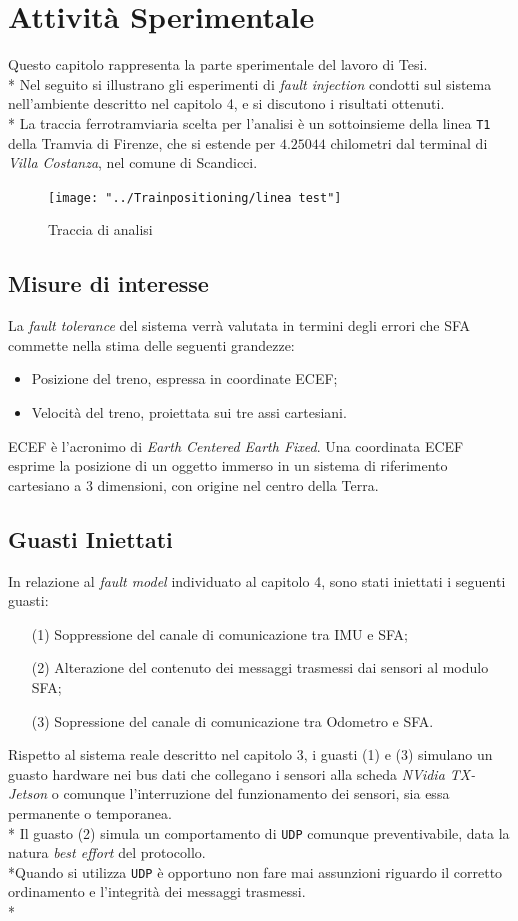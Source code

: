 \chapter{Attivit\`a Sperimentale}
Questo capitolo rappresenta la parte sperimentale del lavoro di Tesi.\\*
Nel seguito si illustrano gli esperimenti di \emph{fault injection} condotti sul sistema nell'ambiente descritto nel capitolo 4, e si discutono i risultati ottenuti.\\*
La traccia ferrotramviaria scelta per l'analisi \`e un sottoinsieme della linea \texttt{T1} della Tramvia di Firenze, che si estende per $4.25044$ chilometri dal terminal di \emph{Villa Costanza}, nel comune di Scandicci. 
\begin{figure}[h]
	\centering
	\texttt{[image: "../Trainpositioning/linea test"]}
	\caption{Traccia di analisi}
	\label{fig:linea-test}
\end{figure}
\section{Misure di interesse}
La \emph{fault tolerance} del sistema verr\`a valutata in termini degli errori che SFA commette nella stima delle seguenti grandezze:
\begin{itemize}
	\item Posizione del treno, espressa in coordinate ECEF;
	\item Velocit\`a del treno, proiettata sui tre assi cartesiani.
\end{itemize}
ECEF \`e l'acronimo di \emph{Earth Centered Earth Fixed}. Una coordinata ECEF esprime la posizione di un oggetto immerso in un sistema di riferimento cartesiano a 3 dimensioni, con origine nel centro della Terra.
\section{Guasti Iniettati}
In relazione al \emph{fault model} individuato al capitolo 4, sono stati iniettati i seguenti guasti:
\begin{enumerate}
	\item[(1)] Soppressione del canale di comunicazione tra IMU e SFA;
	\item[(2)] Alterazione del contenuto dei messaggi trasmessi dai sensori al modulo SFA;
	\item[(3)] Sopressione del canale di comunicazione tra Odometro e SFA.
\end{enumerate}
Rispetto al sistema reale descritto nel capitolo 3, i guasti (1) e (3) simulano un guasto hardware nei bus dati che collegano i sensori alla scheda \emph{NVidia TX-Jetson} o comunque l'interruzione del funzionamento dei sensori, sia essa permanente o temporanea.\\*
Il guasto (2) simula un comportamento di \texttt{UDP} comunque preventivabile, data la natura \emph{best effort} del protocollo.\\*Quando si utilizza \texttt{UDP} \`e opportuno non fare mai assunzioni riguardo il corretto ordinamento e l'integrit\`a dei messaggi trasmessi.\\*
